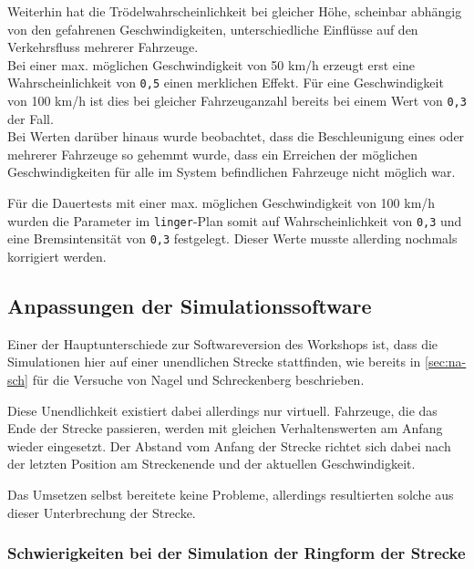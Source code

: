 Weiterhin hat die Trödelwahrscheinlichkeit bei gleicher Höhe, scheinbar abhängig von den gefahrenen Geschwindigkeiten, unterschiedliche Einflüsse auf den Verkehrsfluss mehrerer Fahrzeuge.
\\
Bei einer max. möglichen Geschwindigkeit von 50 km/h erzeugt erst eine Wahrscheinlichkeit von \texttt{0,5} einen merklichen Effekt. Für eine Geschwindigkeit von 100 km/h ist dies bei gleicher Fahrzeuganzahl bereits bei einem Wert von \texttt{0,3} der Fall.
\\
Bei Werten darüber hinaus wurde beobachtet, dass die Beschleunigung eines oder mehrerer Fahrzeuge so gehemmt wurde, dass ein Erreichen der möglichen Geschwindigkeiten für alle im System befindlichen Fahrzeuge nicht möglich war.

Für die Dauertests mit einer max. möglichen Geschwindigkeit von 100 km/h wurden die Parameter im \texttt{linger}-Plan somit auf Wahrscheinlichkeit von \texttt{0,3} und eine Bremsintensität von \texttt{0,3} festgelegt.
Dieser Werte musste allerding nochmals korrigiert werden.





\subsection{Anpassungen der Simulationssoftware}
\label{sec:anpassungen-probleme}

Einer der Hauptunterschiede zur Softwareversion des Workshops ist, dass die Simulationen hier auf einer unendlichen Strecke stattfinden, wie bereits in \cref{sec:na-sch} für die Versuche von Nagel und Schreckenberg beschrieben.

Diese Unendlichkeit existiert dabei allerdings nur virtuell.
Fahrzeuge, die das Ende der Strecke passieren, werden mit gleichen Verhaltenswerten am Anfang wieder eingesetzt.
Der Abstand vom Anfang der Strecke richtet sich dabei nach der letzten Position am Streckenende und der aktuellen Geschwindigkeit.

Das Umsetzen selbst bereitete keine Probleme, allerdings resultierten solche aus dieser Unterbrechung der Strecke.



\subsubsection{Schwierigkeiten bei der Simulation der Ringform der Strecke}
\label{sec:probleme-ringform}

